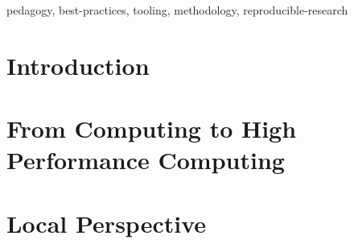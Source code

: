 \documentclass[conference]{IEEEtran}
\begin{document}
\begin{IEEEkeywords}
	pedagogy, best-practices, tooling, methodology, reproducible-research
\end{IEEEkeywords}

\section{Introduction}
\section{From Computing to High Performance Computing}
\section{Local Perspective}
\printbibliography
\end{document}
